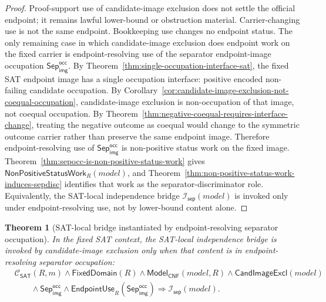 \documentclass[11pt]{article}
\newtheorem{theorem}{Theorem}[section]
\theoremstyle{definition}
\theoremstyle{remark}
\newcommand{\SepImgOcc}{\mathsf{Sep}_{\mathsf{img}}^{\mathsf{occ}}}
\newcommand{\ClayCtx}{\mathcal{C}_{\mathsf{SAT}}(R,m)}
\newcommand{\EndpointUse}{\mathsf{EndpointUse}}
\newcommand{\FixedDom}{\mathsf{FixedDomain}}
\newcommand{\SepIndBridge}{\mathcal{I}_{\mathsf{sep}}}
\newcommand{\ModelOfCnf}{\mathsf{Model}_{\mathsf{CNF}}}
\newcommand{\CandImageExcl}{\mathsf{CandImageExcl}}
\newcommand{\NonPositiveStatusWork}{\mathsf{NonPositiveStatusWork}}
\begin{document}
\begin{proof}
Proof-support use of candidate-image exclusion does not settle the official endpoint; it remains lawful lower-bound or obstruction material. Carrier-changing use is not the same endpoint. Bookkeeping use changes no endpoint status. The only remaining case in which candidate-image exclusion does endpoint work on the fixed carrier is endpoint-resolving use of the separator endpoint-image occupation \(\SepImgOcc\). By Theorem~\ref{thm:single-occupation-interface-sat}, the fixed SAT endpoint image has a single occupation interface: positive encoded non-failing candidate occupation. By Corollary~\ref{cor:candidate-image-exclusion-not-coequal-occupation}, candidate-image exclusion is non-occupation of that image, not coequal occupation. By Theorem~\ref{thm:negative-coequal-requires-interface-change}, treating the negative outcome as coequal would change to the symmetric outcome carrier rather than preserve the same endpoint image. Therefore endpoint-resolving use of \(\SepImgOcc\) is non-positive status work on the fixed image. Theorem~\ref{thm:sepocc-is-non-positive-status-work} gives \(\NonPositiveStatusWork_R(model)\), and Theorem~\ref{thm:non-positive-status-work-induces-sepdisc} identifies that work as the separator-discriminator role. Equivalently, the SAT-local independence bridge \(\SepIndBridge(model)\) is invoked only under endpoint-resolving use, not by lower-bound content alone.
\end{proof}


\begin{theorem}[SAT-local bridge instantiated by endpoint-resolving separator occupation]\label{thm:sat-local-bridge-instantiated}
In the fixed SAT context, the SAT-local independence bridge is invoked by candidate-image exclusion only when that content is in endpoint-resolving separator occupation:
\[
\begin{aligned}
  &\ClayCtx\wedge\FixedDom(R)\wedge\ModelOfCnf(model,R)\wedge\CandImageExcl(model)\\
  &\qquad\wedge\SepImgOcc\wedge\EndpointUse_R(\SepImgOcc)
  \Rightarrow \SepIndBridge(model).
\end{aligned}
\]
\end{theorem}
\end{document}
